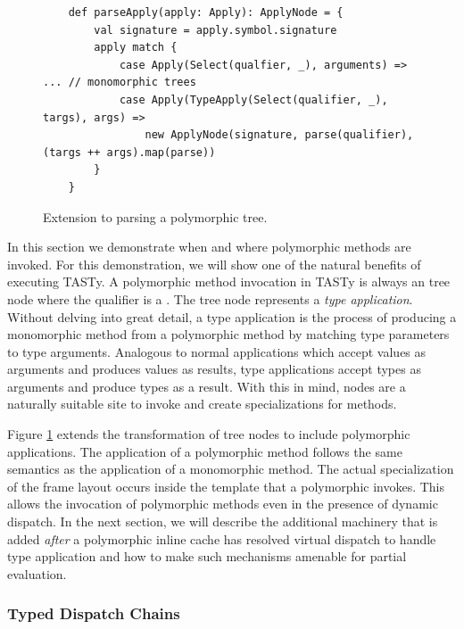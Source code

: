 \begin{figure}[!htb]
	\begin{verbatim}
	def parseApply(apply: Apply): ApplyNode = {
		val signature = apply.symbol.signature
		apply match {
			case Apply(Select(qualfier, _), arguments) => ... // monomorphic trees
			case Apply(TypeApply(Select(qualifier, _), targs), args) =>
				new ApplyNode(signature, parse(qualifier), (targs ++ args).map(parse))
		}
	}
	\end{verbatim}
	\caption{Extension to parsing a polymorphic  tree.}
	\label{impl:parse-typeapply}
\end{figure}

In this section we demonstrate when and where polymorphic methods are invoked.
For this demonstration, we will show one of the natural benefits of executing TASTy.
A polymorphic method invocation in TASTy is always an  tree node where the qualifier is a .
The  tree node represents a \textit{type application}.
Without delving into great detail, a type application is the process of producing a monomorphic method from a polymorphic method by matching type parameters to type arguments.
Analogous to normal applications which accept values as arguments and produces values as results, type applications accept types as arguments and produce types as a result.
With this in mind,  nodes are a naturally suitable site to invoke and create specializations for methods.

Figure \ref{impl:parse-typeapply} extends the transformation of  tree nodes to include polymorphic applications.
The application of a polymorphic method follows the same semantics as the application of a monomorphic method.
The actual specialization of the frame layout occurs inside the template that a polymorphic  invokes.
This allows the invocation of polymorphic methods even in the presence of dynamic dispatch.
In the next section, we will describe the additional machinery that is added \textit{after} a polymorphic inline cache has resolved virtual dispatch to handle type application and how to make such mechanisms amenable for partial evaluation.

\subsubsection*{Typed Dispatch Chains}

